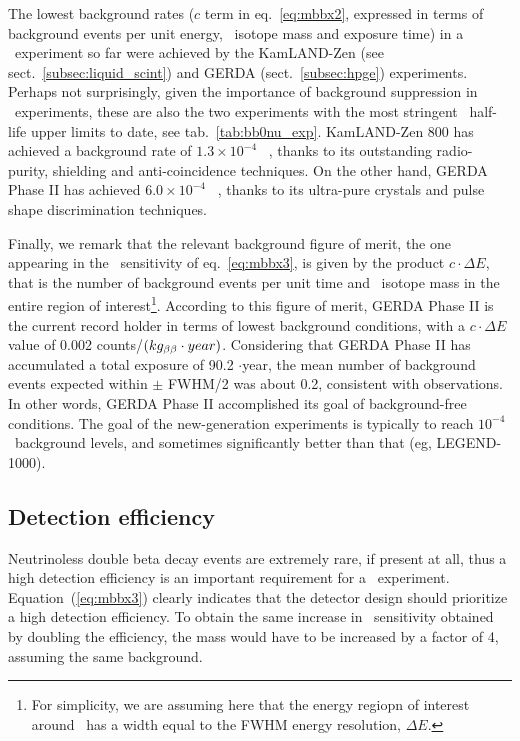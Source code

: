 The lowest background rates ($c$ term in eq.~\ref{eq:mbbx2}, expressed in terms of background events per unit energy, \bb\ isotope mass and exposure time) in a \bbonu\ experiment so far were achieved by the KamLAND-Zen (see sect.~\ref{subsec:liquid_scint}) and GERDA (sect.~\ref{subsec:hpge}) experiments. Perhaps not surprisingly, given the importance of background suppression in \bbonu\ experiments, these are also the two experiments with the most stringent \bbonu\ half-life upper limits to date, see tab.~\ref{tab:bb0nu_exp}. KamLAND-Zen 800 has achieved a background rate of $1.3\times 10^{-4}$ \ckkbby\ \cite{KamLAND-Zen:2022tow}, thanks to its outstanding radio-purity, shielding and anti-coincidence techniques. On the other hand, GERDA Phase II has achieved $6.0\times 10^{-4}$ \ckkbby\ \cite{GERDA:2020xhi}, thanks to its ultra-pure crystals and pulse shape discrimination techniques. 

Finally, we remark that the relevant background figure of merit, the one appearing in the \mbb\ sensitivity of eq.~\ref{eq:mbbx3}, is given by the product $c\cdot \Delta E$, that is the number of background events per unit time and \bb\ isotope mass in the entire region of interest\footnote{For simplicity, we are assuming here that the energy regiopn of interest around \Qbb\ has a width equal to the FWHM energy resolution, $\Delta E$.}. According to this figure of merit, GERDA Phase II is the current record holder in terms of lowest background conditions, with a $c\cdot \Delta E$ value of 0.002 counts/$(kg_{\beta\beta}\cdot year)$. Considering that GERDA Phase II has accumulated a total exposure of 90.2 \kgbb$\cdot$year, the mean number of background events expected within \Qbb $\pm$ FWHM/2 was about 0.2, consistent with observations. In other words, GERDA Phase II accomplished its goal of background-free conditions. The goal of the new-generation experiments is typically to reach $10^{-4}$ \ckkbby\ background levels, and sometimes significantly better than that (eg, LEGEND-1000).




\subsection{Detection efficiency} \label{subsec:efficiency}

Neutrinoless double beta decay events are extremely rare, if present at all, thus a high detection efficiency is an important requirement for a \bb\ experiment. Equation~(\ref{eq:mbbx3}) clearly indicates that the detector design should prioritize a high detection efficiency. To obtain the same increase in \mbb\ sensitivity obtained by doubling the efficiency, the mass would have to be increased by a factor of 4, assuming the same background.

